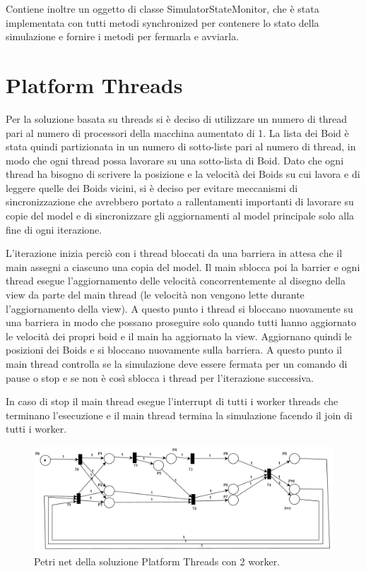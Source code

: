 \documentclass[11pt,notitlepage]{article}
\begin{document}
Contiene inoltre un oggetto di classe \textsf{SimulatorStateMonitor}, che è stata implementata con tutti metodi \textsf{synchronized} per contenere lo stato della simulazione
e fornire i metodi per fermarla e avviarla.

\section{Platform Threads}
Per la soluzione basata su threads si è deciso di utilizzare un numero di thread pari al numero di processori della macchina aumentato di 1. La lista dei Boid è stata
quindi partizionata in un numero di sotto-liste pari al numero di thread, in modo che ogni thread possa lavorare su una sotto-lista di Boid.
Dato che ogni thread ha bisogno di scrivere la posizione e la velocità dei Boids su cui lavora e di leggere quelle dei Boids vicini, si è deciso per evitare meccanismi di 
sincronizzazione che avrebbero portato a rallentamenti importanti di lavorare su copie del model e di sincronizzare gli aggiornamenti al model principale solo alla fine di ogni
iterazione.

L'iterazione inizia perciò con i thread bloccati da una barriera in attesa che il main assegni a ciascuno una copia del model. Il main sblocca poi la barrier e ogni
thread esegue l'aggiornamento delle velocità concorrentemente al disegno della view da parte del main thread (le velocità non vengono lette durante l'aggiornamento della view).
A questo punto i thread si bloccano nuovamente su una barriera in modo che possano proseguire solo quando tutti hanno aggiornato le velocità dei propri boid e il main ha aggiornato
la view. Aggiornano quindi le posizioni dei Boids e si bloccano nuovamente sulla barriera. A questo punto il main thread controlla se la simulazione deve essere fermata per un comando
di pause o stop e se non è così sblocca i thread per l'iterazione successiva.

In caso di stop il main thread esegue l'interrupt di tutti i worker threads che terminano l'esecuzione e il main thread termina la simulazione facendo il join di tutti i worker.

\begin{figure}[H]
    \centering
    \includegraphics[width=\textwidth]{Petri net 1.png}
    \caption{Petri net della soluzione Platform Threads con 2 worker.}
    \label{fig:platform-threads-diagram}
\end{figure}
\end{document}
